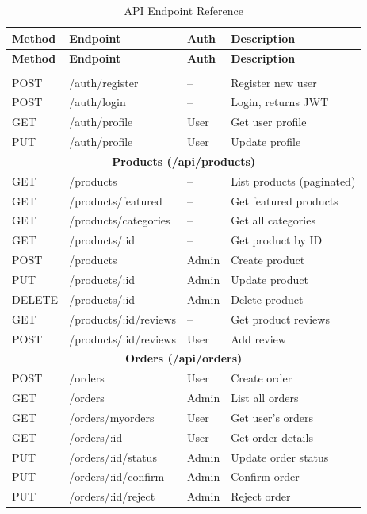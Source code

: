 \documentclass[12pt,a4paper]{report}
\begin{document}
\begin{longtable}{|l|l|l|p{4cm}|}
\caption{API Endpoint Reference} \label{tab:api} \\
\hline
\textbf{Method} & \textbf{Endpoint} & \textbf{Auth} & \textbf{Description} \\
\hline
\endfirsthead
\hline
\textbf{Method} & \textbf{Endpoint} & \textbf{Auth} & \textbf{Description} \\
\hline
\endhead
\hline
\endfoot

\multicolumn{4}{|c|}{\textbf{Authentication (/api/auth)}} \\
\hline
POST & /auth/register & -- & Register new user \\
POST & /auth/login & -- & Login, returns JWT \\
GET & /auth/profile & User & Get user profile \\
PUT & /auth/profile & User & Update profile \\
\hline

\multicolumn{4}{|c|}{\textbf{Products (/api/products)}} \\
\hline
GET & /products & -- & List products (paginated) \\
GET & /products/featured & -- & Get featured products \\
GET & /products/categories & -- & Get all categories \\
GET & /products/:id & -- & Get product by ID \\
POST & /products & Admin & Create product \\
PUT & /products/:id & Admin & Update product \\
DELETE & /products/:id & Admin & Delete product \\
GET & /products/:id/reviews & -- & Get product reviews \\
POST & /products/:id/reviews & User & Add review \\
\hline

\multicolumn{4}{|c|}{\textbf{Orders (/api/orders)}} \\
\hline
POST & /orders & User & Create order \\
GET & /orders & Admin & List all orders \\
GET & /orders/myorders & User & Get user's orders \\
GET & /orders/:id & User & Get order details \\
PUT & /orders/:id/status & Admin & Update order status \\
PUT & /orders/:id/confirm & Admin & Confirm order \\
PUT & /orders/:id/reject & Admin & Reject order \\
\hline


\end{longtable}
\end{document}
